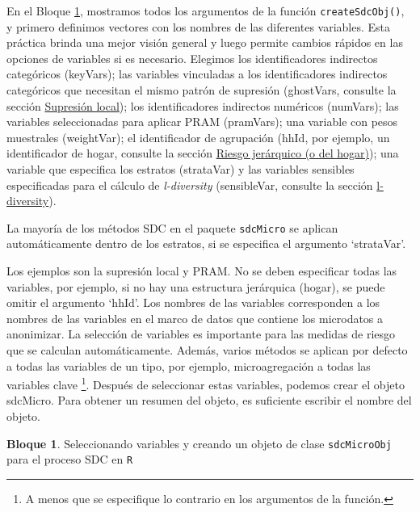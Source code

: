 \documentclass[
]{book}
\theoremstyle{definition}
\theoremstyle{definition}
\newtheorem{example}{Bloque}[chapter]
\theoremstyle{definition}
\theoremstyle{definition}
\theoremstyle{remark}
\begin{document}
En el Bloque \ref{exm:bloqueMicro8}, mostramos todos los argumentos de la función \texttt{createSdcObj()}, y primero definimos vectores con los nombres de las diferentes variables. Esta práctica brinda una mejor visión general y luego permite cambios rápidos en las opciones de variables si es necesario. Elegimos los identificadores indirectos categóricos (keyVars); las variables vinculadas a los identificadores indirectos categóricos que necesitan el mismo patrón de supresión (ghostVars, consulte la sección \protect\hyperlink{sup-loc}{Supresión local}); los identificadores indirectos numéricos (numVars); las variables seleccionadas para aplicar PRAM (pramVars); una variable con pesos muestrales (weightVar); el identificador de agrupación (hhId, por ejemplo, un identificador de hogar, consulte la sección \protect\hyperlink{riesgo-jeruxe1rquico-o-del-hogar}{Riesgo jerárquico (o del hogar)}); una variable que especifica los estratos (strataVar) y las variables sensibles especificadas para el cálculo de \emph{l-diversity} (sensibleVar, consulte la sección \protect\hyperlink{l-diversity}{l-diversity}).

La mayoría de los métodos SDC en el paquete \texttt{sdcMicro} se aplican automáticamente dentro de los estratos, si se especifica el argumento `strataVar'.

Los ejemplos son la supresión local y PRAM. No se deben especificar todas las variables, por ejemplo, si no hay una estructura jerárquica (hogar), se puede omitir el argumento `hhId'. Los nombres de las variables corresponden a los nombres de las variables en el marco de datos que contiene los microdatos a anonimizar. La selección de variables es importante para las medidas de riesgo que se calculan automáticamente. Además, varios métodos se aplican por defecto a todas las variables de un tipo, por ejemplo, microagregación a todas las variables clave \footnote{A menos que se especifique lo contrario en los argumentos de la función.}. Después de seleccionar estas variables, podemos crear el objeto sdcMicro. Para obtener un resumen del objeto, es suficiente escribir el nombre del objeto.

\begin{example}
\protect\hypertarget{exm:bloqueMicro8}{}\label{exm:bloqueMicro8}Seleccionando variables y creando un objeto de clase \texttt{sdcMicroObj} para el proceso SDC en \texttt{R}
\end{example}
\end{document}
